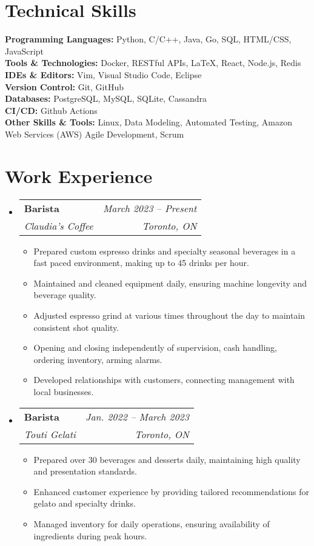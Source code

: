 \documentclass[letterpaper,11pt]{article}
\makeatletter
\newcommand{\resumeItem}[1]{
  \item\small{
    {#1 \vspace{-2pt}}
  }
}
\newcommand{\resumeSubheading}[4]{
  \vspace{-2pt}\item
    \begin{tabular*}{0.97\textwidth}[t]{l@{\extracolsep{\fill}}r}
      \textbf{#1} & #2 \\
      \textit{\small#3} & \textit{\small #4} \\
    \end{tabular*}\vspace{-7pt}
}
\newcommand{\resumeSubHeadingListStart}{\begin{itemize}[leftmargin=0.15in, label={}]}
\newcommand{\resumeSubHeadingListEnd}{\end{itemize}}
\newcommand{\resumeItemListStart}{\begin{itemize}}
\newcommand{\resumeItemListEnd}{\end{itemize}\vspace{-5pt}}
\makeatother
\begin{document}
\section{Technical Skills}
 \begin{itemize}[leftmargin=0.15in, label={}]
    \small{\item{
	\textbf{Programming Languages:} Python, C/C++, Java, Go, SQL, HTML/CSS, JavaScript \\
	\textbf{Tools \& Technologies:} Docker, RESTful APIs, LaTeX, React, Node.js, Redis \\
	\textbf{IDEs \& Editors:} Vim, Visual Studio Code, Eclipse \\
	\textbf{Version Control:} Git, GitHub \\
	\textbf{Databases:} PostgreSQL, MySQL, SQLite, Cassandra \\
	\textbf{CI/CD:} Github Actions \\
	\textbf{Other Skills \& Tools:} Linux, Data Modeling, Automated Testing, Amazon Web Services (AWS) Agile Development, Scrum
    }}
 \end{itemize}


\section{Work Experience}
  \resumeSubHeadingListStart

    \resumeSubheading
    {Barista}{\emph{March 2023 -- Present}}
      {Claudia's Coffee}{Toronto, ON}
      \resumeItemListStart
        \resumeItem{Prepared custom espresso drinks and specialty seasonal beverages in a fast paced environment, making up to 45 drinks per hour.}
	\resumeItem{Maintained and cleaned equipment daily, ensuring machine longevity and beverage quality.}
	\resumeItem{Adjusted espresso grind at various times throughout the day to maintain consistent shot quality.}
	\resumeItem{Opening and closing independently of supervision, cash handling, ordering inventory, arming alarms.}
	\resumeItem{Developed relationships with customers, connecting management with local businesses.}
      \resumeItemListEnd

    \resumeSubheading
    {Barista}{\emph{Jan. 2022 -- March 2023}}
      {Touti Gelati}{Toronto, ON}
      \resumeItemListStart
      \resumeItem{Prepared over 30 beverages and desserts daily, maintaining high quality and presentation standards.}
      \resumeItem{Enhanced customer experience by providing tailored recommendations for gelato and specialty drinks.}
      \resumeItem{Managed inventory for daily operations, ensuring availability of ingredients during peak hours.}
      \resumeItemListEnd
  \resumeSubHeadingListEnd


\end{document}
